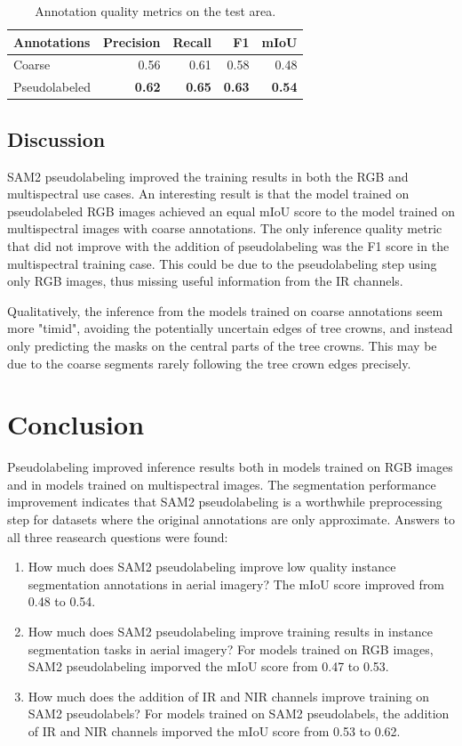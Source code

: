 \documentclass[english, 12pt, a4paper, sci, utf8, a-2b, online]{aaltothesis}
\begin{document}
\begin{table}[h]
    \centering
    \begin{tabular}{lrrrr}
        Annotations & Precision & Recall & F1 & mIoU \\
        \hline
        Coarse & 0.56 & 0.61 & 0.58 & 0.48 \\
        Pseudolabeled & \textbf{0.62} & \textbf{0.65} & \textbf{0.63} & \textbf{0.54} \\
    \end{tabular}
    \caption{Annotation quality metrics on the test area.}
    \label{table:metrics-labels}
\end{table}


\subsection{Discussion}

SAM2 pseudolabeling improved the training results in both the RGB and multispectral use cases. An interesting result is that the model trained on pseudolabeled RGB images achieved an equal mIoU score to the model trained on multispectral images with coarse annotations. The only inference quality metric that did not improve with the addition of pseudolabeling was the F1 score in the multispectral training case. This could be due to the pseudolabeling step using only RGB images, thus missing useful information from the IR channels.

Qualitatively, the inference from the models trained on coarse annotations seem more "timid", avoiding the potentially uncertain edges of tree crowns, and instead only predicting the masks on the central parts of the tree crowns. This may be due to the coarse segments rarely following the tree crown edges precisely.


\clearpage
\newpage
\section{Conclusion}

Pseudolabeling improved inference results both in models trained on RGB images and in models trained on multispectral images. The segmentation performance improvement indicates that SAM2 pseudolabeling is a worthwhile preprocessing step for datasets where the original annotations are only approximate. Answers to all three reasearch questions were found:

\begin{enumerate}
\item How much does SAM2 pseudolabeling improve low quality instance segmentation annotations in aerial imagery? The mIoU score improved from 0.48 to 0.54.
\item How much does SAM2 pseudolabeling improve training results in instance segmentation tasks in aerial imagery? For models trained on RGB images, SAM2 pseudolabeling imporved the mIoU score from 0.47 to 0.53.
\item How much does the addition of IR and NIR channels improve training on SAM2 pseudolabels? For models trained on SAM2 pseudolabels, the addition of IR and NIR channels imporved the mIoU score from 0.53 to 0.62.
\end{enumerate}
\end{document}

